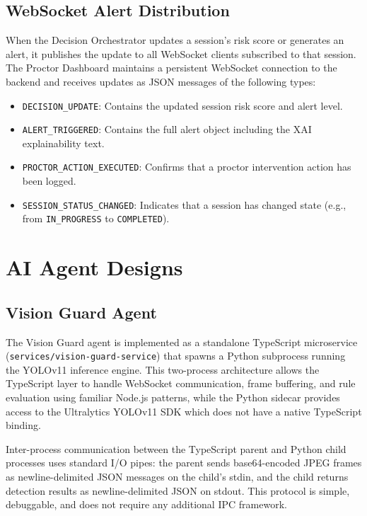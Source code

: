 \subsection{WebSocket Alert Distribution}

When the Decision Orchestrator updates a session's risk score or generates an alert, it publishes the update to all WebSocket clients subscribed to that session. The Proctor Dashboard maintains a persistent WebSocket connection to the backend and receives updates as JSON messages of the following types:

\begin{itemize}
    \item \texttt{DECISION\_UPDATE}: Contains the updated session risk score and alert level.
    \item \texttt{ALERT\_TRIGGERED}: Contains the full alert object including the XAI explainability text.
    \item \texttt{PROCTOR\_ACTION\_EXECUTED}: Confirms that a proctor intervention action has been logged.
    \item \texttt{SESSION\_STATUS\_CHANGED}: Indicates that a session has changed state (e.g., from \texttt{IN\_PROGRESS} to \texttt{COMPLETED}).
\end{itemize}

\section{AI Agent Designs}

\subsection{Vision Guard Agent}

The Vision Guard agent is implemented as a standalone TypeScript microservice (\texttt{services/vision-guard-service}) that spawns a Python subprocess running the YOLOv11 inference engine. This two-process architecture allows the TypeScript layer to handle WebSocket communication, frame buffering, and rule evaluation using familiar Node.js patterns, while the Python sidecar provides access to the Ultralytics YOLOv11 SDK which does not have a native TypeScript binding.

Inter-process communication between the TypeScript parent and Python child processes uses standard I/O pipes: the parent sends base64-encoded JPEG frames as newline-delimited JSON messages on the child's stdin, and the child returns detection results as newline-delimited JSON on stdout. This protocol is simple, debuggable, and does not require any additional IPC framework.

